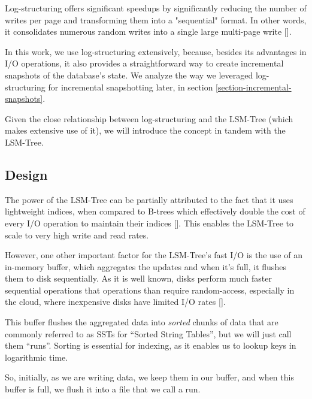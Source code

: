Log-structuring offers significant speedups by significantly reducing the number of writes per page and transforming them into a "sequential" format.
In other words, it consolidates numerous random writes into a single large multi-page write [\cite{llama}].

In this work, we use log-structuring extensively, because, besides its advantages in I/O operations, it also provides a straightforward way to create incremental snapshots of the database's state.
We analyze the way we leveraged log-structuring for incremental snapshotting later, in section \ref{section-incremental-snapshots}.

Given the close relationship between log-structuring and the LSM-Tree (which makes extensive use of it), we will introduce the concept in tandem with the LSM-Tree.

\subsection{Design}

The power of the LSM-Tree can be partially attributed to the fact that it uses lightweight indices, when compared to B-trees which effectively double the cost of every I/O operation to maintain their indices [\cite{lsmtree}].
This enables the LSM-Tree to scale to very high write and read rates.

However, one other important factor for the LSM-Tree's fast I/O is the use of an in-memory buffer, which aggregates the updates and when it's full, it flushes them to disk sequentially.
As it is well known, disks perform much faster sequential operations that operations than require random-access, especially in the cloud, where inexpensive disks have limited I/O rates [\cite{llama}].

This buffer flushes the aggregated data into \textit{sorted} chunks of data that are commonly referred to as SSTs for ``Sorted String Tables'', but we will just call them ``runs''.
Sorting is essential for indexing, as it enables us to lookup keys in logarithmic time.

So, initially, as we are writing data, we keep them in our buffer, and when this buffer is full, we flush it into a file that we call a run.





